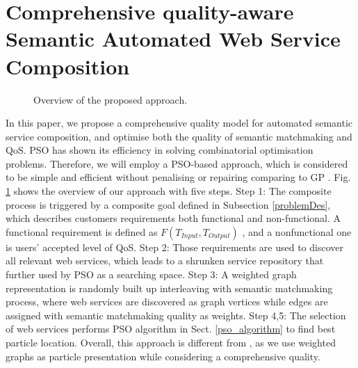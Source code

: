 \documentclass{llncs}
\begin{document}
\section{Comprehensive quality-aware Semantic Automated Web Service Composition}\label{qswsc_approach}
\begin{figure}[h]
\centerline{
}
 \caption{Overview of the proposed approach.}
 \label{overview}
\end{figure}
In this paper, we propose a comprehensive quality model for automated semantic service composition, and optimise both the quality of semantic matchmaking and QoS. PSO has shown its efficiency in solving combinatorial optimisation problems. Therefore, we will employ a PSO-based approach, which is considered to be simple and efficient without penalising or repairing comparing to GP \cite{da2014graph}. Fig. \ref{overview} shows the overview of our approach with five steps. Step 1: The composite process is triggered by a composite goal defined in Subsection \ref{problemDes}, which describes customers requirements both functional and non-functional. A functional requirement is defined as $F(T_{Input}, T_{Output})$ , and a nonfunctional one is users' accepted level of QoS. Step 2: Those requirements are used to discover all relevant web services, which leads to a shrunken service repository that further used by PSO as a searching space. Step 3: A weighted graph representation is randomly built up interleaving with semantic matchmaking process, where web services are discovered as graph vertices while edges are assigned with semantic matchmaking quality as weights. Step 4,5: The selection of web services performs PSO algorithm in Sect. \ref{pso_algorithm} to find best particle location. Overall, this approach is different from \cite{da2016particle}, as we use weighted graphs as particle presentation while considering a comprehensive quality.
\end{document}
